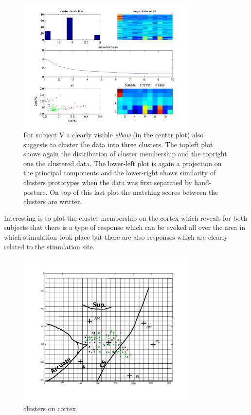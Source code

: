 \begin{figure}[ht]
    \centering
        \includegraphics[width=0.8\textwidth]{images/raw_clusters_vega.jpg}
    \caption{For subject V a clearly visible \emph{elbow} (in the center plot) also suggests to cluster the data into three clusters. The topleft plot shows again the distribution of cluster membership and the topright one the clustered data. The lower-left plot is again a projection on the principal components and the lower-right shows similarity of clusters prototypes when the data was first separated by hand-posture. On top of this last plot the matching scores between the clusters are written.}
    \label{sg:fig:Documents_uni_yifat_lab_results_evoked_syns_raw_clusters_vega}
\end{figure}


Interesting is to plot the cluster membership on the cortex which reveals for both subjects that there is a type of response which can be evoked all over the area in which stimulation took place but there are also responses which are clearly related to the stimulation site. 
\begin{figure}[ht]
    \centering
        \includegraphics[width=0.8\textwidth]{images/cluster_vega.jpg}
    \caption{clusters on cortex}
    \label{sg:fig:images_cluster_vega}
\end{figure}


